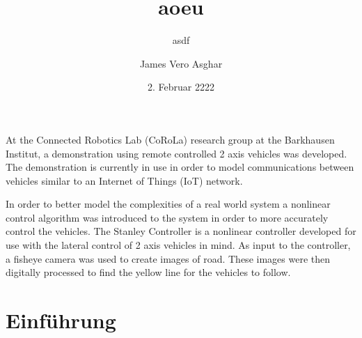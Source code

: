 \documentclass[arbeit=studie,oneside,BCOR=12mm]{ArbeitRST}
\begin{document}

\author{James Vero Asghar}



\title{aoeu}

\subtitle{asdf}


\date{2. Februar 2222}


\pagestyle{plain}


\maketitle



\selbststaendigkeitserklaerung


{At the Connected Robotics Lab (CoRoLa) research group at the Barkhausen 
Institut, a demonstration using remote controlled 2 axis vehicles was developed.
The demonstration is currently in use in order to model communications between 
vehicles similar to an Internet of Things (IoT) network.

In order to better model the complexities of a real world system a nonlinear 
control algorithm was introduced to the system in order to more accurately
control the vehicles. The Stanley Controller is a nonlinear controller
developed for use with the lateral control of 2 axis vehicles in mind. As input
to the controller, a fisheye camera was used to create images of road. These 
images were then digitally processed to find the yellow line for the vehicles
to follow.}


\tableofcontents

\chapter{Einführung}
\end{document}

